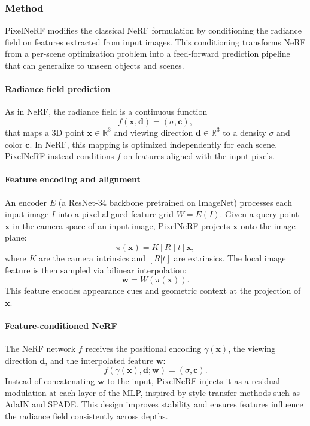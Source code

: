 \begin{enrichment}
\begin{enrichment}
     \subsubsection{Method}
     \label{subsec:chapter23_pixelnerf_method}
     
     PixelNeRF modifies the classical NeRF formulation by conditioning the radiance field on features extracted from input images. This conditioning transforms NeRF from a per-scene optimization problem into a feed-forward prediction pipeline that can generalize to unseen objects and scenes.
     
     \paragraph{Radiance field prediction}  
     As in NeRF, the radiance field is a continuous function
     \[
     f(\mathbf{x}, \mathbf{d}) = (\sigma, \mathbf{c}),
     \]
     that maps a 3D point $\mathbf{x}\in \mathbb{R}^3$ and viewing direction $\mathbf{d}\in \mathbb{R}^3$ to a density $\sigma$ and color $\mathbf{c}$. In NeRF, this mapping is optimized independently for each scene. PixelNeRF instead conditions $f$ on features aligned with the input pixels.
     
     \paragraph{Feature encoding and alignment}  
     An encoder $E$ (a ResNet-34 backbone pretrained on ImageNet) processes each input image $I$ into a pixel-aligned feature grid $W=E(I)$. Given a query point $\mathbf{x}$ in the camera space of an input image, PixelNeRF projects $\mathbf{x}$ onto the image plane:
     \[
     \pi(\mathbf{x}) = K[R \;|\; t]\mathbf{x},
     \]
     where $K$ are the camera intrinsics and $[R|t]$ are extrinsics. The local image feature is then sampled via bilinear interpolation:
     \[
     \mathbf{w} = W(\pi(\mathbf{x})).
     \]
     This feature encodes appearance cues and geometric context at the projection of $\mathbf{x}$.
     
     \paragraph{Feature-conditioned NeRF}  
     The NeRF network $f$ receives the positional encoding $\gamma(\mathbf{x})$, the viewing direction $\mathbf{d}$, and the interpolated feature $\mathbf{w}$:
     \[
     f(\gamma(\mathbf{x}), \mathbf{d}; \mathbf{w}) = (\sigma, \mathbf{c}).
     \]
     Instead of concatenating $\mathbf{w}$ to the input, PixelNeRF injects it as a residual modulation at each layer of the MLP, inspired by style transfer methods such as AdaIN and SPADE. This design improves stability and ensures features influence the radiance field consistently across depths.
     

\end{enrichment}
\end{enrichment}
